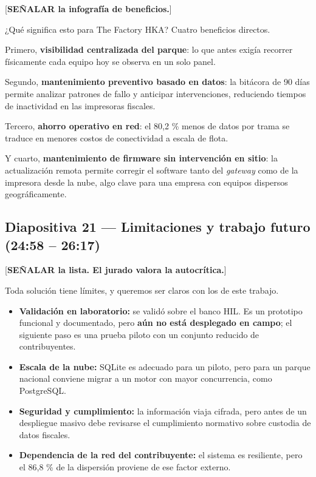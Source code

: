 \documentclass[11pt, a4paper]{article}
\begin{document}
[\textbf{SEÑALAR la infografía de beneficios.}]

¿Qué significa esto para The Factory HKA? Cuatro beneficios directos.

Primero, \textbf{visibilidad centralizada del parque}: lo que antes exigía recorrer físicamente cada equipo hoy se observa en un solo panel.

Segundo, \textbf{mantenimiento preventivo basado en datos}: la bitácora de 90 días permite analizar patrones de fallo y anticipar intervenciones, reduciendo tiempos de inactividad en las impresoras fiscales.

Tercero, \textbf{ahorro operativo en red}: el 80,2 \% menos de datos por trama se traduce en menores costos de conectividad a escala de flota.

Y cuarto, \textbf{mantenimiento de firmware sin intervención en sitio}: la actualización remota permite corregir el software tanto del \textit{gateway} como de la impresora desde la nube, algo clave para una empresa con equipos dispersos geográficamente.

\subsection*{Diapositiva 21 — Limitaciones y trabajo futuro (24:58 – 26:17)}

[\textbf{SEÑALAR la lista. El jurado valora la autocrítica.}]

Toda solución tiene límites, y queremos ser claros con los de este trabajo.

\begin{itemize}[label=-]
    \item \textbf{Validación en laboratorio:} se validó sobre el banco HIL. Es un prototipo funcional y documentado, pero \textbf{aún no está desplegado en campo}; el siguiente paso es una prueba piloto con un conjunto reducido de contribuyentes.
    \item \textbf{Escala de la nube:} SQLite es adecuado para un piloto, pero para un parque nacional conviene migrar a un motor con mayor concurrencia, como PostgreSQL.
    \item \textbf{Seguridad y cumplimiento:} la información viaja cifrada, pero antes de un despliegue masivo debe revisarse el cumplimiento normativo sobre custodia de datos fiscales.
    \item \textbf{Dependencia de la red del contribuyente:} el sistema es resiliente, pero el 86,8 \% de la dispersión proviene de ese factor externo.
\end{itemize}
\end{document}
